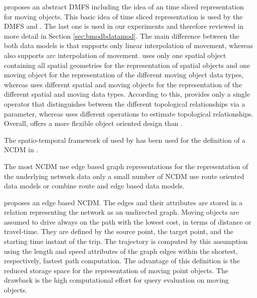 \documentclass[a4paper]{article}
\begin{document}
\cite{RepresentingMovingObjectsGueting} proposes an abstract DMFS including the
idea of an time sliced representation for moving objects. This basic idea of
time sliced representation is used by the DMFS \cite{STAUPelekis} and
\cite{DataModelDataStructureGueting}. The last one is used in our experiments
and therefore reviewed in more detail in Section \ref{sec:bmodbdatamod}.
The main difference between the both data models is that
\cite{DataModelDataStructureGueting} supports only linear interpolation of movement,
whereas \cite{STAUPelekis} also supports arc interpolation of movement.
\cite{STAUPelekis} uses only one spatial object
containing all spatial geometries for the representation of spatial objects and
one moving object for the representation of the different moving object data types,
whereas \cite{DataModelDataStructureGueting} uses different spatial and moving
objects for the representation of the different spatial and moving data types.
According to this, \cite{STAUPelekis} provides only a single operator that
distinguishes
between the different topological relationships via a parameter, whereas
\cite{DataModelDataStructureGueting} uses different operations to estimate
topological relationships. Overall, \cite{STAUPelekis} offers a more flexible
object oriented design than \cite{DataModelDataStructureGueting}.

The spatio-temporal framework of \cite{RepresentingMovingObjectsGueting} used by
\cite{DataModelDataStructureGueting} has been used for the definition of a
NCDM in \cite{NetworkGueting}.

The most NCDM use edge based graph representations for the representation of the
underlying network data only a small number of NCDM use route oriented data
models or combine route and edge based data models.

\cite{NetworkVazirgiannis} proposes an edge based NCDM. The edges and their
attributes
are stored in a relation representing the network as an undirected graph. Moving
objects are assumed to drive always on the path with the lowest cost,
in terms of distance or travel-time. They are defined by the source point, the
target point, and the starting time instant of the trip. The trajectory is
computed by this assumption using the length and speed attributes of the graph
edges within the shortest, respectively, fastest path computation.
The advantage of this definition is the reduced storage space for the representation
of moving point objects. The drawback is the high computational effort for query
evaluation on moving objects.
\end{document}
